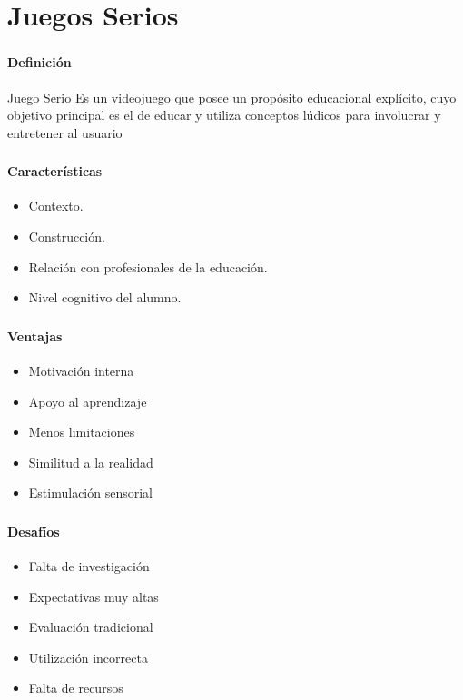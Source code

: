 
\section{Juegos Serios}
\setcounter{sectiontotal}{5}

\begin{frame}
    \frametitle{\pagetitle}
    \framesubtitle{Definición}
    \pause{}
    \begin{block}{Juego Serio}
    \centering
    Es un videojuego que posee un propósito educacional explícito, cuyo objetivo
    principal es el de educar y utiliza conceptos lúdicos para involucrar y
    entretener al usuario
    \end{block}
\end{frame}

\begin{frame}
    \frametitle{\pagetitle}
    \framesubtitle{Características}
     \begin{itemize}[<+->]
         \item Contexto.
         \item Construcción.
         \item Relación con profesionales de la educación.
         \item Nivel cognitivo del alumno.
    \end{itemize}
\end{frame}

\begin{frame}
    \frametitle{\pagetitle}
    \framesubtitle{Ventajas}
    \begin{itemize}[<+->]
        \item Motivación interna
        \item Apoyo al aprendizaje
        \item Menos limitaciones
        \item Similitud a la realidad
        \item Estimulación sensorial
    \end{itemize}
\end{frame}

\begin{frame}
    \frametitle{\pagetitle}
    \framesubtitle{Desafíos}
	\begin{itemize}[<+->]
        \item Falta de investigación
        \item Expectativas muy altas
        \item Evaluación tradicional
        \item Utilización incorrecta
        \item Falta de recursos
    \end{itemize}
\end{frame}

